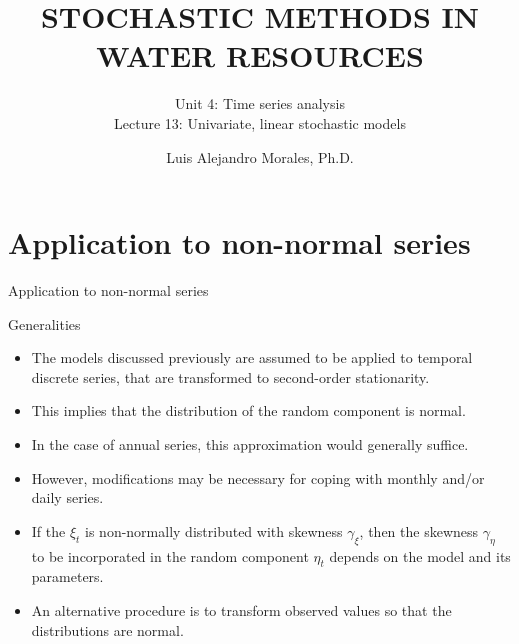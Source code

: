 \documentclass[8pt]{beamer}
\title{STOCHASTIC METHODS IN WATER RESOURCES}
\subtitle{Unit 4: Time series analysis \\ Lecture 13: Univariate, linear stochastic models}
\author{Luis Alejandro Morales, Ph.D.}
\institute{Universidad Nacional de Colombia \\ Department of Civil and Agriculture Engineering} %
\renewcommand{\emph}[1]{\textcolor{myorange}{#1}}
\begin{document}
\begin{frame}
    \titlepage
\end{frame}

\section{Application to non-normal series}
\begin{frame}{Application to non-normal series}
    \begin{block}{Generalities}
    \end{block}
    \begin{itemize}
        \item The models discussed previously are assumed to be applied to temporal discrete series, that are transformed to \emph{second-order stationarity}.
        \item This implies that the distribution of the \emph{random component} is \emph{normal}. 
        \item In the case of \emph{annual series}, this approximation would generally suffice.
        \item However, modifications may be necessary for coping with \emph{monthly} and/or \emph{daily} series.
        \item If the $\xi_t$ is \emph{non-normally distributed} with \emph{skewness} $\gamma_{\xi}$, then the skewness $\gamma_{\eta}$ to be incorporated in the random component $\eta_t$ depends on the model and its parameters.
        \item An alternative procedure is to \emph{transform} observed values so that the distributions are \emph{normal}.
    \end{itemize}
\end{frame}
\end{document}

